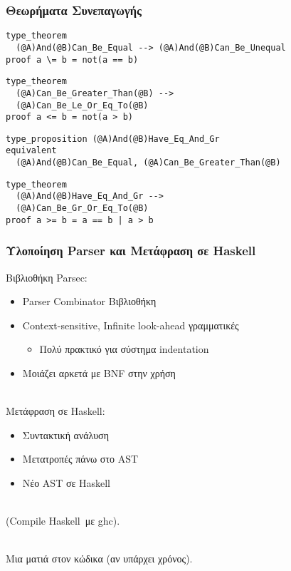 \documentclass{beamer}
\def\e{\foreignlanguage{english}}
\def\h{\e{Haskell}}
\begin{document}
\begin{frame}[fragile]

\frametitle{Θεωρήματα Συνεπαγωγής}

\begin{otherlanguage}{english}
\begin{verbatim}
type_theorem
  (@A)And(@B)Can_Be_Equal --> (@A)And(@B)Can_Be_Unequal
proof a \= b = not(a == b)
\end{verbatim}
\pause
\begin{verbatim}
type_theorem
  (@A)Can_Be_Greater_Than(@B) -->
  (@A)Can_Be_Le_Or_Eq_To(@B)
proof a <= b = not(a > b)
\end{verbatim}
\pause
\begin{verbatim}
type_proposition (@A)And(@B)Have_Eq_And_Gr
equivalent
  (@A)And(@B)Can_Be_Equal, (@A)Can_Be_Greater_Than(@B)
\end{verbatim}
\pause
\begin{verbatim}
type_theorem
  (@A)And(@B)Have_Eq_And_Gr -->
  (@A)Can_Be_Gr_Or_Eq_To(@B)
proof a >= b = a == b | a > b

\end{verbatim}
\end{otherlanguage}

\end{frame}

\begin{frame}

\frametitle{Υλοποίηση \e{Parser} και Μετάφραση σε \h}

Βιβλιοθήκη \e{Parsec}:

\begin{itemize}
\item \e{Parser Combinator} Βιβλιοθήκη
\item \e{Context-sensitive, Infinite look-ahead} γραμματικές
\begin{itemize}
\item Πολύ πρακτικό για σύστημα \e{indentation}
\end{itemize}
\item Μοιάζει αρκετά με \e{BNF} στην χρήση
\\~\
\end{itemize}

\pause
Μετάφραση σε \h:
\begin{itemize}
\item Συντακτική ανάλυση
\item Μετατροπές πάνω στο \e{AST}
\item Νέο \e{AST} σε \h
\\~\
\end{itemize}

\pause
(\e{Compile} \h\ με \e{ghc}).
\\~\

Μια ματιά στον κώδικα (αν υπάρχει χρόνος).
\end{frame}
\end{document}
